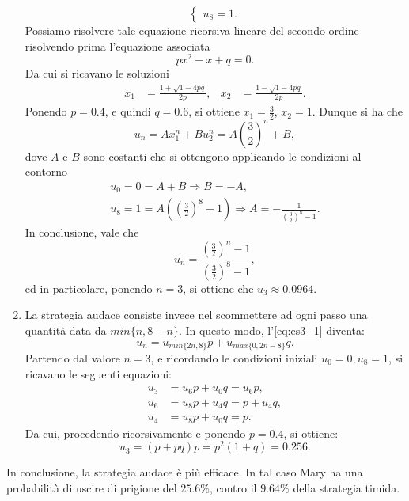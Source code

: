 \documentclass[
	12pt, %
]{fphw}
\begin{document}
\begin{enumerate}
\begin{equation*}
\begin{cases}
				u_8 = 1.
			\end{cases}
		\end{equation*}
		Possiamo risolvere tale equazione ricorsiva lineare del secondo ordine risolvendo prima l'equazione associata
		\begin{equation*}
			px^2 - x + q = 0.
		\end{equation*}
		Da cui si ricavano le soluzioni
		\begin{align*}
			x_1 &= \frac{1 + \sqrt{1 - 4pq}}{2p}, & x_2 &= \frac{1 - \sqrt{1 - 4pq}}{2p}.
		\end{align*}
		Ponendo $p = 0.4$, e quindi $q = 0.6$, si ottiene $x_1 = \frac{3}{2}$, $x_2 = 1$.
		Dunque si ha che
		\begin{equation*}
			u_n = Ax_1^n + Bu_2^n = A\left( \frac{3}{2} \right)^n + B,
		\end{equation*}
		dove $A$ e $B$ sono costanti che si ottengono applicando le condizioni al contorno
		\begin{equation*}
			\begin{gathered}
				u_0 = 0 = A + B \Rightarrow  B = -A, \\
				u_8 = 1 = A\left( \left( \frac{3}{2} \right)^8 - 1 \right) \Rightarrow A = - \frac{1}{\left( \frac{3}{2} \right)^8 - 1}.
			\end{gathered}
		\end{equation*}
		In conclusione, vale che
		\begin{equation*}
			u_n = \frac{\left( \frac{3}{2} \right)^n - 1}{\left( \frac{3}{2} \right)^8 - 1},
		\end{equation*}
		ed in particolare, ponendo $n = 3$, si ottiene che $u_3 \approx 0.0964$.
	
	\item La strategia audace consiste invece nel scommettere ad ogni passo una quantità data da $min\{n, 8-n\}$.
		In questo modo, l'\autoref{eq:es3_1} diventa:
		\begin{equation*}
			u_n = u_{min\{2n, 8\}}p + u_{max\{0, 2n-8\}}q.
		\end{equation*}
		Partendo dal valore $n = 3$, e ricordando le condizioni iniziali $u_0 = 0, u_8 = 1$, si ricavano le seguenti equazioni:
		\begin{equation*}
			\begin{aligned}
				u_3 &= u_6p + u_0q = u_6p,	\\
				u_6 &= u_8p + u_4q = p + u_4q,	\\
				u_4 &= u_8p + u_0q = p.				
			\end{aligned}
		\end{equation*}
		Da cui, procedendo ricorsivamente e ponendo $p = 0.4$, si ottiene:
		\begin{equation*}
			u_3 = (p + pq)p = p^2(1 + q) = 0.256.
		\end{equation*}
\end{enumerate}
In conclusione, la strategia audace è più efficace.
In tal caso Mary ha una probabilità di uscire di prigione del $25.6\%$, contro il $9.64\%$ della strategia timida.
\end{document}
